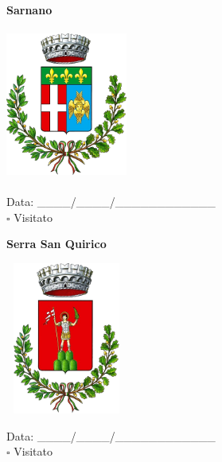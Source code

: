 \documentclass[a5paper,12pt]{article}
\begin{document}
\vspace{0.7cm}

\noindent
\begin{minipage}[t]{0.45\textwidth}
    \begin{center}
        \textbf{Sarnano}
    \end{center}
    \vspace{-0.5cm} %
    \begin{center}
        \includegraphics[height= 5cm, width=4cm]{Marche/Stemma Sarnano.png}
    \end{center}
    \vspace{-0.4cm} %
    \begin{flushleft}
        Data: \_\_\_\_/\_\_\_\_/\_\_\_\_\_\_\_\_\_\_\_\_ \\
        $\square$ Visitato
    \end{flushleft}
\end{minipage}
\hfill
\noindent
\begin{minipage}[t]{0.45\textwidth}
    \begin{center}
        \textbf{Serra San Quirico}
    \end{center}
    \vspace{-0.5cm} %
    \begin{center}
        \includegraphics[height= 5cm, width=4cm]{Marche/Stemma Serra San Quirico.png}
    \end{center}
    \vspace{-0.4cm} %
    \begin{flushleft}
        Data: \_\_\_\_/\_\_\_\_/\_\_\_\_\_\_\_\_\_\_\_\_ \\
        $\square$ Visitato
    \end{flushleft}
\end{minipage}
\hfill
\end{document}
